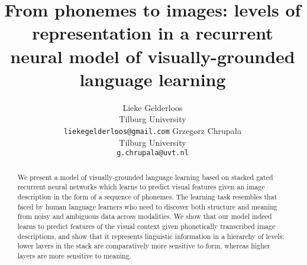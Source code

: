\documentclass[11pt,a4paper]{article}
\title{From phonemes to images: levels of representation in a recurrent neural
model of visually-grounded language learning}
\author{Lieke Gelderloos \\
    Tilburg University \\
    {\tt liekegelderloos@gmail.com} \And
    Grzegorz Chrupała \\
    Tilburg University \\
    {\tt g.chrupala@uvt.nl} }
\date{}
\begin{document}
\maketitle
\begin{abstract}
We present a model of visually-grounded language learning based on stacked gated recurrent neural networks which learns to predict visual features given an image description in the form of a sequence of phonemes. The learning task resembles that faced by human language learners who need to discover both structure and meaning from noisy and ambiguous data across modalities. We show that our model indeed learns to predict features of the visual context given phonetically transcribed image descriptions, and show that it represents linguistic information in a hierarchy of levels: lower layers in the stack are comparatively more sensitive to form, whereas higher layers are more sensitive to meaning.
\end{abstract}












\end{document}
